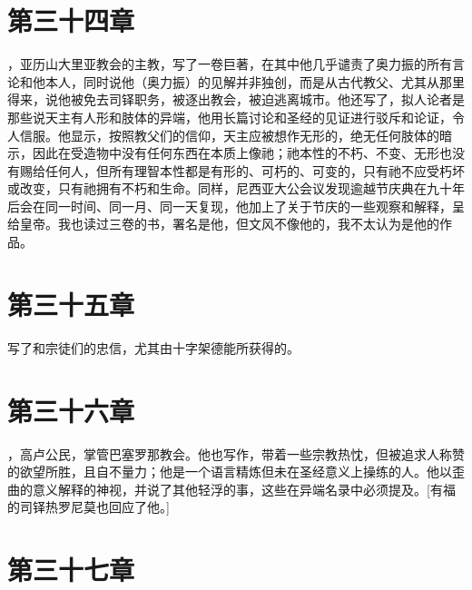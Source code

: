 \section{第三十四章}

，亚历山大里亚教会的主教，写了一卷巨著，在其中他几乎谴责了奥力振的所有言论和他本人，同时说他（奥力振）的见解并非独创，而是从古代教父、尤其从那里得来，说他被免去司铎职务，被逐出教会，被迫逃离城市。他还写了，拟人论者是那些说天主有人形和肢体的异端，他用长篇讨论和圣经的见证进行驳斥和论证，令人信服。他显示，按照教父们的信仰，天主应被想作无形的，绝无任何肢体的暗示，因此在受造物中没有任何东西在本质上像祂；祂本性的不朽、不变、无形也没有赐给任何人，但所有理智本性都是有形的、可朽的、可变的，只有祂不应受朽坏或改变，只有祂拥有不朽和生命。同样，尼西亚大公会议发现逾越节庆典在九十年后会在同一时间、同一月、同一天复现，他加上了关于节庆的一些观察和解释，呈给皇帝。我也读过三卷的书，署名是他，但文风不像他的，我不太认为是他的作品。\par


\section{第三十五章}

写了和宗徒们的忠信，尤其由十字架德能所获得的。\par


\section{第三十六章}

，高卢公民，掌管巴塞罗那教会。他也写作，带着一些宗教热忱，但被追求人称赞的欲望所胜，且自不量力；他是一个语言精炼但未在圣经意义上操练的人。他以歪曲的意义解释的神视，并说了其他轻浮的事，这些在异端名录中必须提及。[有福的司铎热罗尼莫也回应了他。]\par


\section{第三十七章}

